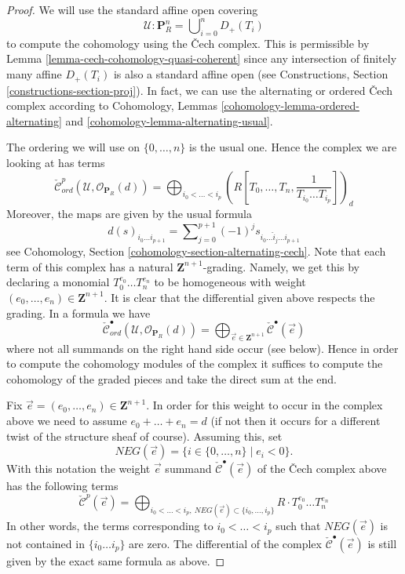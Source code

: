 \documentclass[10pt,a4paper]{amsart}
\theoremstyle{plain}
\theoremstyle{definition}
\theoremstyle{remark}
\numberwithin{equation}{subsection}
\begin{document}
\begin{proof}
We will use the standard affine open covering
$$
\mathcal{U} : \mathbf{P}^n_R = \bigcup\nolimits_{i = 0}^n D_{+}(T_i)
$$
to compute the cohomology using the {\v C}ech complex.
This is permissible by Lemma \ref{lemma-cech-cohomology-quasi-coherent}
since any intersection of finitely many affine $D_{+}(T_i)$ is also a
standard affine open (see
Constructions, Section \ref{constructions-section-proj}).
In fact, we can use the alternating or ordered {\v C}ech complex according to
Cohomology, Lemmas \ref{cohomology-lemma-ordered-alternating} and
\ref{cohomology-lemma-alternating-usual}.

\medskip\noindent
The ordering we will use on $\{0, \ldots, n\}$ is the usual one.
Hence the complex we are looking at has terms
$$
\check{\mathcal{C}}_{ord}^p(\mathcal{U}, \mathcal{O}_{\mathbf{P}_R}(d))
=
\bigoplus\nolimits_{i_0 < \ldots < i_p}
(R[T_0, \ldots, T_n, \frac{1}{T_{i_0} \ldots T_{i_p}}])_d
$$
Moreover, the maps are given by the usual formula
$$
d(s)_{i_0 \ldots i_{p + 1}} =
\sum\nolimits_{j = 0}^{p + 1} (-1)^j s_{i_0 \ldots \hat i_j \ldots i_{p + 1}}
$$
see Cohomology, Section \ref{cohomology-section-alternating-cech}.
Note that each term of this complex has a natural
$\mathbf{Z}^{n + 1}$-grading. Namely, we get this by declaring a monomial
$T_0^{e_0} \ldots T_n^{e_n}$ to be homogeneous with weight
$(e_0, \ldots, e_n) \in \mathbf{Z}^{n + 1}$. It is clear that the differential
given above respects the grading. In a formula we have
$$
\check{\mathcal{C}}_{ord}^\bullet(\mathcal{U}, \mathcal{O}_{\mathbf{P}_R}(d))
=
\bigoplus\nolimits_{\vec{e} \in \mathbf{Z}^{n + 1}}
\check{\mathcal{C}}^\bullet(\vec{e})
$$
where not all summands on the right hand side occur (see below).
Hence in order to compute the cohomology
modules of the complex it suffices to compute the cohomology of the graded
pieces and take the direct sum at the end.

\medskip\noindent
Fix $\vec{e} = (e_0, \ldots, e_n) \in \mathbf{Z}^{n + 1}$. In order for this
weight to occur in the complex above we need to assume
$e_0 + \ldots + e_n = d$ (if not then it occurs for a different twist of
the structure sheaf of course). Assuming this, set
$$
NEG(\vec{e}) = \{i \in \{0, \ldots, n\} \mid e_i < 0\}.
$$
With this notation the weight $\vec{e}$ summand
$\check{\mathcal{C}}^\bullet(\vec{e})$ of the {\v C}ech complex above has
the following terms
$$
\check{\mathcal{C}}^p(\vec{e})
=
\bigoplus\nolimits_{i_0 < \ldots < i_p,
\ NEG(\vec{e}) \subset \{i_0, \ldots, i_p\}}
R \cdot T_0^{e_0} \ldots T_n^{e_n}
$$
In other words, the terms corresponding to $i_0 < \ldots < i_p$ such
that $NEG(\vec{e})$ is not contained in $\{i_0 \ldots i_p\}$ are zero.
The differential of the complex $\check{\mathcal{C}}^\bullet(\vec{e})$
is still given by the exact same formula as above.


\end{proof}
\end{document}

